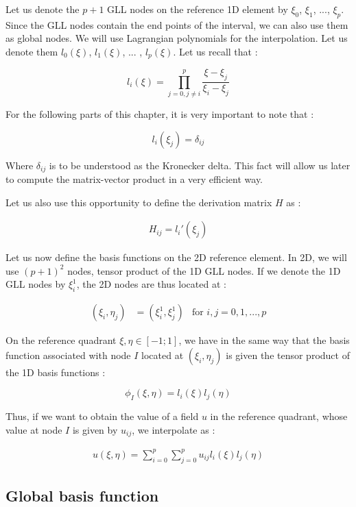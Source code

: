Let us denote the $p+1$ GLL nodes on the reference 1D element by $\xi_0$, $\xi_1$, ..., $\xi_p$. Since the GLL nodes contain the end points of the interval, we can also use them as global nodes. We will use Lagrangian polynomials for the interpolation. Let us denote them $l_0(\xi)$, $l_1(\xi)$, ... , $l_p(\xi)$. Let us recall that : 

$$ l_i(\xi) = \prod_{j=0 , j\neq i}^p \frac{\xi - \xi_j}{\xi_i  - \xi_j}$$

For the following parts of this chapter, it is very important to note that :

$$ l_i(\xi_j) = \delta_{ij} $$ 

Where $\delta_{ij}$ is to be understood as the Kronecker delta. This fact will allow us later to compute the matrix-vector product in a very efficient way. 

Let us also use this opportunity to define the derivation matrix $H$ as : 

\begin{align}
H_{ij} = l_i'(\xi_j)
\end{align}

Let us now define the basis functions on the 2D reference element. In 2D, we will use $(p+1)^2$ nodes, tensor product of the 1D GLL nodes. If we denote the 1D GLL nodes by $\xi_i^1$, the 2D nodes are thus located at :

\begin{align*}
(\xi_i, \eta_j) &= (\xi^1_i,\xi^1_j) &\text{for $i,j=0,1,...,p$}
\end{align*}

On the reference quadrant $\xi, \eta \in [-1;1]$, we have in the same way that the basis function associated with node $I$ located at $(\xi_i,\eta_j)$ is given the tensor product of the 1D basis functions : 

$$\phi_I(\xi,\eta) = l_i(\xi)l_j(\eta)$$

Thus, if we want to obtain the value of a field $u$ in the reference quadrant, whose value at node $I$ is given by $u_{ij}$, we interpolate as : 

\begin{align*}
u(\xi,\eta) = \sum_{i=0}^p\sum_{j=0}^p u_{ij}l_i(\xi)l_j(\eta)
\end{align*}

\subsection{Global basis function}

